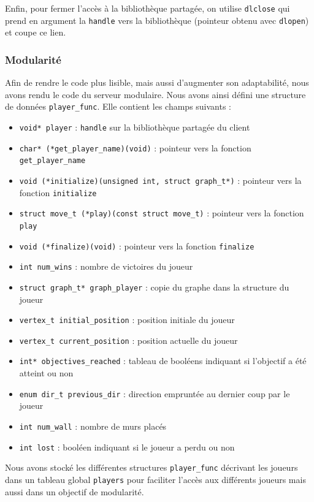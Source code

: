 Enfin, pour fermer l'accès à la bibliothèque partagée, on utilise \texttt{dlclose} qui prend en argument la \texttt{handle} vers la bibliothèque (pointeur obtenu avec \texttt{dlopen}) et coupe ce lien.


\subsubsection*{Modularité}

Afin de rendre le code plus lisible, mais aussi d'augmenter son adaptabilité, nous avons rendu le code du serveur modulaire.
Nous avons ainsi défini une structure de données \texttt{player\_func}.
Elle contient les champs suivants :
\begin{itemize}
\item \texttt{void* player} : \texttt{handle} sur la bibliothèque partagée du client
\item \texttt{char* (*get\_player\_name)(void)} : pointeur vers la fonction \texttt{get\_player\_name} 
\item \texttt{void (*initialize)(unsigned int, struct graph\_t*)} : pointeur vers la fonction \texttt{initialize}
\item \texttt{struct move\_t (*play)(const struct move\_t)} : pointeur vers la fonction \texttt{play}
\item \texttt{void (*finalize)(void)} : pointeur vers la fonction \texttt{finalize}
\item \texttt{int num\_wins} : nombre de victoires du joueur
\item \texttt{struct graph\_t* graph\_player} : copie du graphe dans la structure du joueur
\item \texttt{vertex\_t initial\_position} : position initiale du joueur
\item \texttt{vertex\_t current\_position} : position actuelle du joueur
\item \texttt{int* objectives\_reached} : tableau de booléens indiquant si l'objectif a été atteint ou non
\item \texttt{enum dir\_t previous\_dir} : direction empruntée au dernier coup par le joueur
\item \texttt{int num\_wall} : nombre de murs placés
  \item \texttt{int lost} : booléen indiquant si le joueur a perdu ou non
\end{itemize}

\bigskip

Nous avons stocké les différentes structures \texttt{player\_func} décrivant les joueurs dans un tableau global \texttt{players} pour faciliter l'accès aux différents joueurs mais aussi dans un objectif de modularité.

